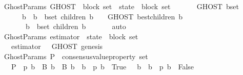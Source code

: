\begin{isabellebody}
\isanewline
\isanewline
\isanewline
{}\isamarkupfalse%
\ {\isacharparenleft}\ GhostParams{\isacharparenright}\ GHOST\ {\isacharcolon}{\isacharcolon}\ {\isachardoublequoteopen}{\isacharparenleft}block\ set\ {\isacharasterisk}\ state{\isacharparenright}\ {\isacharequal}{\isachargreater}\ block\ set{\isachardoublequoteclose}\isanewline
\ \ \isanewline
\ \ \ \ {\isachardoublequoteopen}GHOST\ {\isacharparenleft}b{\isacharunderscore}set{\isacharcomma}\ {\isasymsigma}{\isacharparenright}\ {\isacharequal}\isanewline
\ \ \ \ \ \ {\isacharparenleft}{\isasymUnion}\ b\ {\isasymin}\ {\isacharbraceleft}b\ {\isasymin}\ b{\isacharunderscore}set{\isachardot}\ children\ {\isacharparenleft}b{\isacharcomma}\ {\isasymsigma}{\isacharparenright}\ {\isasymnoteq}\ {\isasymemptyset}{\isacharbraceright}{\isachardot}\ GHOST\ {\isacharparenleft}best{\isacharunderscore}children\ {\isacharparenleft}b{\isacharcomma}\ {\isasymsigma}{\isacharparenright}{\isacharcomma}\ {\isasymsigma}{\isacharparenright}{\isacharparenright}\isanewline
\ \ \ \ \ \ \ {\isasymunion}\ {\isacharbraceleft}b\ {\isasymin}\ b{\isacharunderscore}set{\isachardot}\ children\ {\isacharparenleft}b{\isacharcomma}\ {\isasymsigma}{\isacharparenright}\ {\isacharequal}\ {\isasymemptyset}{\isacharbraceright}{\isachardoublequoteclose}\isanewline
%
\isadelimproof
\ \ %
\endisadelimproof
%
\isatagproof
{}\isamarkupfalse%
\ auto%
\endisatagproof
{\isafoldproof}%
%
\isadelimproof
\isanewline
%
\endisadelimproof
\isanewline
\isanewline
{}\isamarkupfalse%
\ {\isacharparenleft}\ GhostParams{\isacharparenright}\ estimator\ {\isacharcolon}{\isacharcolon}\ {\isachardoublequoteopen}state\ {\isasymRightarrow}\ block\ set{\isachardoublequoteclose}\isanewline
\ \ \isanewline
\ \ \ \ {\isachardoublequoteopen}estimator\ {\isasymsigma}\ {\isacharequal}\ GHOST\ {\isacharparenleft}{\isacharbraceleft}genesis{\isacharbraceright}{\isacharcomma}\ {\isasymsigma}{\isacharparenright}{\isachardoublequoteclose}\isanewline
\isanewline
\isanewline
{}\isamarkupfalse%
\ {\isacharparenleft}\ GhostParams{\isacharparenright}\ P\ {\isacharcolon}{\isacharcolon}\ {\isachardoublequoteopen}consensus{\isacharunderscore}value{\isacharunderscore}property\ set{\isachardoublequoteclose}\isanewline
\ \ \isanewline
\ \ \ \ {\isachardoublequoteopen}P\ {\isasymequiv}\ {\isacharbraceleft}p{\isachardot}\ {\isasymexists}{\isacharbang}b\ {\isasymin}\ B{\isachardot}\ {\isasymforall}b{\isacharprime}\ {\isasymin}\ B{\isachardot}\ {\isacharparenleft}b\ {\isasymdownharpoonright}\ b{\isacharprime}\ {\isasymlongrightarrow}\ p\ b{\isacharprime}\ {\isacharequal}\ True{\isacharparenright}\ {\isasymand}\ {\isasymnot}\ {\isacharparenleft}b\ {\isasymdownharpoonright}\ b{\isacharprime}\ {\isasymlongrightarrow}\ p\ b{\isacharprime}\ {\isacharequal}\ False{\isacharparenright}{\isacharbraceright}{\isachardoublequoteclose}\isanewline

\end{isabellebody}
